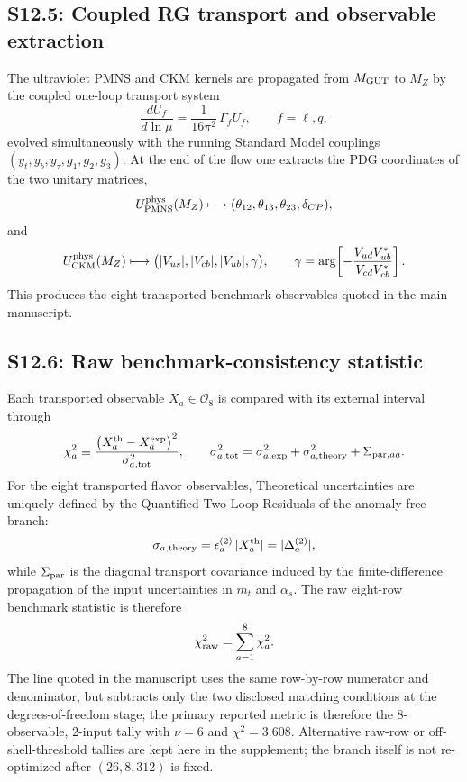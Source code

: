 \documentclass[11pt]{article}
\begin{document}
\subsection*{S12.5: Coupled RG transport and observable extraction}

The ultraviolet PMNS and CKM kernels are propagated from $M_{\rm GUT}$ to $M_Z$
by the coupled one-loop transport system
\begin{equation}
 \frac{dU_f}{d\ln\mu}=\frac{1}{16\pi^2}\,\Gamma_fU_f,
 \qquad f=\ell,q,
\end{equation}
evolved simultaneously with the running Standard Model couplings
$(y_t,y_b,y_{\tau},g_1,g_2,g_3)$. At the end of the flow one extracts the PDG
coordinates of the two unitary matrices,
\begin{equation}
 U_{\rm PMNS}^{\rm phys}(M_Z)
 \longmapsto
 (\theta_{12},\theta_{13},\theta_{23},\delta_{CP}),
\end{equation}
and
\begin{equation}
 U_{\rm CKM}^{\rm phys}(M_Z)
 \longmapsto
 \bigl(|V_{us}|,|V_{cb}|,|V_{ub}|,\gamma\bigr),
 \qquad
 \gamma=\arg\!\left[-\frac{V_{ud}V_{ub}^{\ast}}{V_{cd}V_{cb}^{\ast}}\right].
\end{equation}
This produces the eight transported benchmark observables quoted in the main
manuscript.

\subsection*{S12.6: Raw benchmark-consistency statistic}

Each transported observable $X_a\in\mathcal O_8$ is compared with its external
interval through
\begin{equation}
 \chi_a^2
 \equiv
 \frac{\bigl(X_a^{\rm th}-X_a^{\rm exp}\bigr)^2}{\sigma_{a,{\rm tot}}^2},
 \qquad
\sigma_{a,{\rm tot}}^2
=
 \sigma_{a,{\rm exp}}^2+\sigma_{a,{\rm theory}}^2+\Sigma_{{\rm par},aa}.
\end{equation}
For the eight transported flavor observables, Theoretical uncertainties are uniquely defined by the Quantified Two-Loop Residuals of the anomaly-free branch:
\begin{equation}
 \sigma_{a,{\rm theory}}=\epsilon_a^{(2)}\,|X_a^{\rm th}|=|\Delta_a^{(2)}|,
\end{equation}
while $\Sigma_{\rm par}$ is the diagonal transport covariance induced by the
finite-difference propagation of the input uncertainties in $m_t$ and
$\alpha_s$. The raw eight-row benchmark statistic is therefore
\begin{equation}
 \chi_{\rm raw}^2
 =
 \sum_{a=1}^{8}\chi_a^2.
\end{equation}
The line quoted in the manuscript uses the same
row-by-row numerator and denominator, but subtracts only the two disclosed matching
conditions at the degrees-of-freedom stage; the primary reported metric is
therefore the $8$-observable, $2$-input tally with $\nu=6$ and
$\chi^2=3.608$. Alternative raw-row or off-shell-threshold tallies are kept
here in the supplement; the branch itself is not re-optimized after $(26,8,312)$ is fixed.
\end{document}
